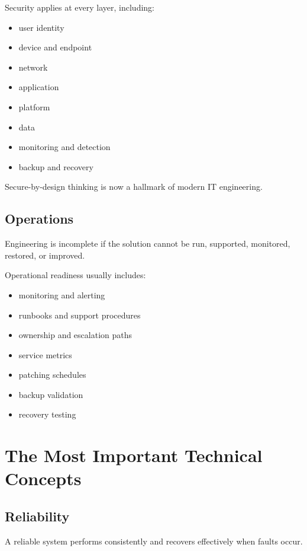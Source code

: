 \documentclass[
  british,
  letterpaper,
  DIV=11,
  numbers=noendperiod]{scrartcl}
\providecommand{\tightlist}{%
  \setlength{\itemsep}{0pt}\setlength{\parskip}{0pt}}
\begin{document}
Security applies at every layer, including:

\begin{itemize}
\tightlist
\item
  user identity
\item
  device and endpoint
\item
  network
\item
  application
\item
  platform
\item
  data
\item
  monitoring and detection
\item
  backup and recovery
\end{itemize}

Secure-by-design thinking is now a hallmark of modern IT engineering.

\subsection{Operations}\label{operations}

Engineering is incomplete if the solution cannot be run, supported,
monitored, restored, or improved.

Operational readiness usually includes:

\begin{itemize}
\tightlist
\item
  monitoring and alerting
\item
  runbooks and support procedures
\item
  ownership and escalation paths
\item
  service metrics
\item
  patching schedules
\item
  backup validation
\item
  recovery testing
\end{itemize}

\section{The Most Important Technical
Concepts}\label{the-most-important-technical-concepts}

\subsection{Reliability}\label{reliability}

A reliable system performs consistently and recovers effectively when
faults occur.
\end{document}
